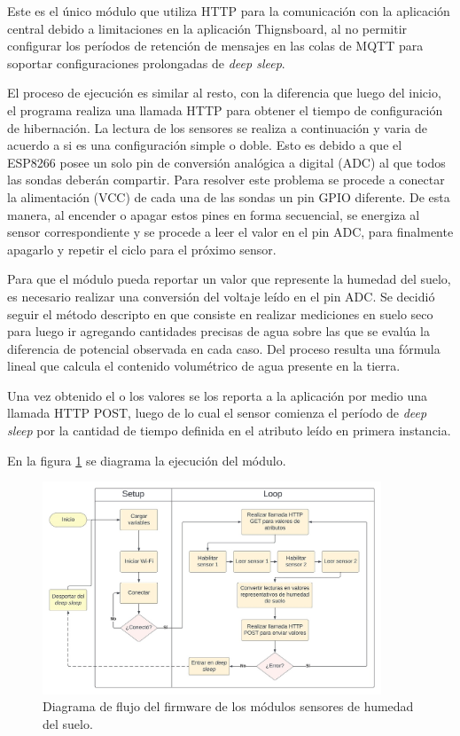 Este es el único módulo que utiliza HTTP para la comunicación con la aplicación central debido a limitaciones en la aplicación Thignsboard, al no permitir configurar los períodos de retención de mensajes en las colas de MQTT para soportar configuraciones prolongadas de  \textit{deep sleep}. 

El proceso de ejecución es similar al resto, con la diferencia que luego del inicio, el programa realiza una llamada HTTP para obtener el tiempo de configuración de hibernación. La lectura de los sensores se realiza a continuación y varia de acuerdo a si es una configuración simple o doble. Esto es debido a que el ESP8266 posee un solo pin de conversión analógica a digital (ADC) al que todos las sondas deberán compartir. Para resolver este problema se procede a conectar la alimentación (VCC) de cada una de las sondas un pin GPIO diferente. De esta manera, al encender o apagar estos pines en forma secuencial, se energiza al sensor correspondiente y se procede a leer el valor en el pin ADC, para finalmente apagarlo y repetir el ciclo para el próximo sensor.

Para que el módulo pueda reportar un valor que represente la humedad del suelo, es necesario realizar una conversión del voltaje leído en el pin ADC. Se decidió seguir el método descripto en \citep{soilcalibration} que consiste en realizar mediciones en suelo seco para luego ir agregando cantidades precisas de agua sobre las que se evalúa la diferencia de potencial observada en cada caso. Del proceso resulta una fórmula lineal que calcula el contenido volumétrico de agua presente en la tierra.

Una vez obtenido el o los valores se los reporta a la aplicación por medio una llamada HTTP POST, luego de lo cual el sensor comienza el período de \textit{deep sleep} por la cantidad de tiempo definida en el atributo leído en primera instancia.

En la figura \ref{fig:flow_soilsensor} se diagrama la ejecución del módulo.


\begin{figure}[!h]
	\centering
	\includegraphics[width=0.9\textwidth]{./Figures/chapter3/FirmwareSoilSensor.jpg}
	\caption[Diagrama de flujo del firmware de los módulos sensores de humedad del suelo]{Diagrama de flujo del firmware de los módulos sensores de humedad del suelo.}
	\label{fig:flow_soilsensor}
\end{figure}


